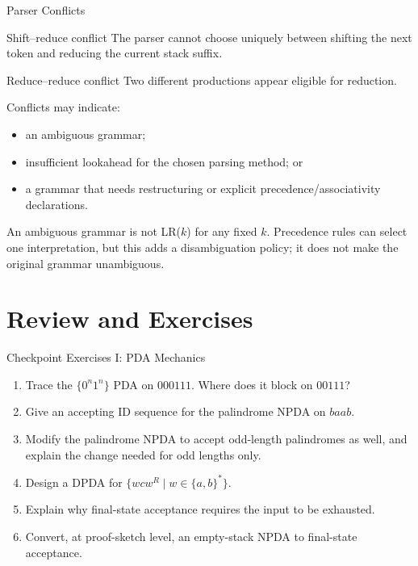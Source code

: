 \documentclass[10pt]{beamer}
\begin{document}
\begin{frame}{Parser Conflicts}
  \small
  \begin{alertblock}{Shift--reduce conflict}
    The parser cannot choose uniquely between shifting the next token and reducing the current stack suffix.
  \end{alertblock}
  \pause
  \begin{alertblock}{Reduce--reduce conflict}
    Two different productions appear eligible for reduction.
  \end{alertblock}
  Conflicts may indicate:
  \begin{itemize}
    \item an ambiguous grammar;
    \item insufficient lookahead for the chosen parsing method; or
    \item a grammar that needs restructuring or explicit precedence/associativity declarations.
  \end{itemize}
  An ambiguous grammar is not LR($k$) for any fixed $k$. Precedence rules
  can select one interpretation, but this adds a disambiguation policy;
  it does not make the original grammar unambiguous.
\end{frame}


\section{Review and Exercises}

\begin{frame}{Checkpoint Exercises I: PDA Mechanics}
  \small
  \begin{enumerate}
    \item Trace the $\{0^n1^n\}$ PDA on $000111$. Where does it block on $00111$?
    \item Give an accepting ID sequence for the palindrome NPDA on $baab$.
    \item Modify the palindrome NPDA to accept odd-length palindromes as well,
      and explain the change needed for odd lengths only.
    \item Design a DPDA for $\{wcw^R\mid w\in\{a,b\}^*\}$.
    \item Explain why final-state acceptance requires the input to be exhausted.
    \item Convert, at proof-sketch level, an empty-stack NPDA to final-state acceptance.
  \end{enumerate}
\end{frame}
\end{document}
